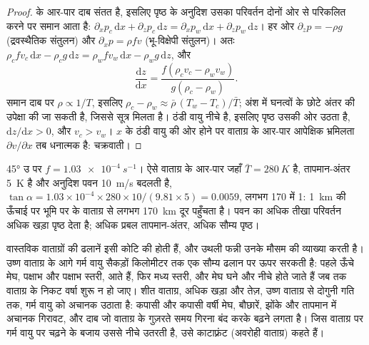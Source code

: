 \begin{proof}
 के आर-पार दाब संतत है, इसलिए पृष्ठ के अनुदिश उसका परिवर्तन दोनों ओर से
परिकलित करने पर समान आता है: $\partial_x p_c\,\mathrm{d}x + \partial_z p_c\,\mathrm{d}z =
\partial_x p_w\,\mathrm{d}x + \partial_z p_w\,\mathrm{d}z$। हर ओर $\partial_z p = -\rho g$
(द्रवस्थैतिक संतुलन) और $\partial_x p = \rho f v$ (भू-विक्षेपी संतुलन)। अतः
$\rho_c f v_c\,\mathrm{d}x - \rho_c g\,\mathrm{d}z = \rho_w f v_w\,\mathrm{d}x - \rho_w
g\,\mathrm{d}z$, और
\[
  \frac{\mathrm{d}z}{\mathrm{d}x} = \frac{f(\rho_c v_c - \rho_w v_w)}{g(\rho_c - \rho_w)} .
\]
समान दाब पर $\rho \propto 1/T$, इसलिए $\rho_c - \rho_w \approx \bar\rho\,(T_w -
T_c)/\bar T$; अंश में घनत्वों के छोटे अंतर की उपेक्षा की जा सकती है, जिससे
सूत्र मिलता है। ठंडी वायु नीचे है, इसलिए पृष्ठ उसकी ओर उठता है, $\mathrm{d}z/
\mathrm{d}x > 0$, और $v_c > v_w$। $x$ के ठंडी वायु की ओर होने पर वाताग्र के आर-पार आपेक्षिक भ्रमिलता
$\partial v/\partial x$ तब धनात्मक है: चक्रवाती।
\end{proof}

\begin{example}[एक प्रतिनिधि ढलान]\label{ex:b2:weather-systems:slope}
\ang{45} उ पर $f = \qty{1.03e-4}{s^{-1}}$। ऐसे वाताग्र के आर-पार जहाँ $\bar T = \qty{280}{K}$ है,
तापमान-अंतर \qty{5}{K} है और अनुदिश पवन \qty{10}{m/s} बदलती है, $\tan\alpha
= 1.03 \times 10^{-4} \times 280 \times 10/(9.81 \times 5) = 0.0059$, लगभग 170 में 1:
 \qty{1}{km} की ऊँचाई पर भूमि पर के वाताग्र से लगभग \qty{170}{km} दूर पहुँचता है।
पवन का अधिक तीखा परिवर्तन अधिक खड़ा पृष्ठ देता है; अधिक प्रबल तापमान-अंतर, अधिक सौम्य पृष्ठ।
\end{example}

वास्तविक वाताग्रों की ढलानें इसी कोटि की होती हैं, और उथली फन्नी उनके मौसम की व्याख्या करती है। उष्ण
वाताग्र के आगे गर्म वायु सैकड़ों किलोमीटर तक एक सौम्य ढलान पर ऊपर सरकती है: पहले ऊँचे मेघ,
पक्षाभ और पक्षाभ स्तरी, आते हैं, फिर मध्य स्तरी, और मेघ घने और नीचे होते जाते हैं जब तक
वाताग्र के निकट वर्षा शुरू न हो जाए। शीत वाताग्र, अधिक खड़ा और तेज़, उष्ण वाताग्र से दोगुनी गति तक,
गर्म वायु को अचानक उठाता है: कपासी और कपासी वर्षी मेघ, बौछारें, झोंके और तापमान में अचानक गिरावट,
और दाब जो वाताग्र के गुज़रते समय गिरना बंद करके बढ़ने लगता है। जिस वाताग्र पर गर्म वायु
 पर चढ़ने के बजाय उससे नीचे उतरती है, उसे काटाफ़्रंट (अवरोही वाताग्र) कहते हैं।

